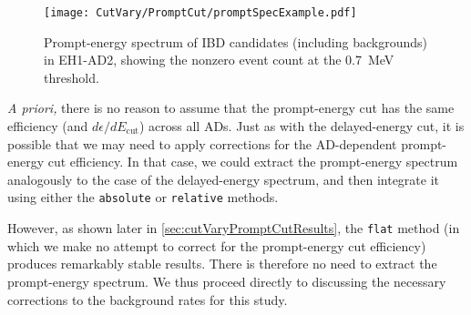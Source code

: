 \documentclass[../thesis.tex]{subfiles}
\begin{document}
\begin{figure}[h]
  \texttt{[image: CutVary/PromptCut/promptSpecExample.pdf]}
  \caption{Prompt-energy spectrum of IBD candidates (including backgrounds) in EH1-AD2, showing the nonzero event count at the 0.7~MeV threshold.}
  \label{fig:cutVaryPromptCutExampleSpectrum}
\end{figure}

\emph{A priori,} there is no reason to assume that the prompt-energy cut has the same efficiency (and $d\epsilon/dE_{\mathrm{cut}}$) across all ADs. Just as with the delayed-energy cut, it is possible that we may need to apply corrections for the AD-dependent prompt-energy cut efficiency. In that case, we could extract the prompt-energy spectrum analogously to the case of the delayed-energy spectrum, and then integrate it using either the \texttt{absolute} or \texttt{relative} methods.
%
\begin{comment}
Compared to the delayed-energy spectrum, it may be possible to more accurately measure the absolute efficiency, given the lack of a long tail. Even though the rate of prompt-like singles rises very steeply around 0.7~MeV, the accidentals rate is bottlenecked by the rate of delayed-like singles, so the accidentals subtraction can still be performed accurately. However, the \emph{correlated} backgrounds each have their own externally supplied prompt-energy spectra, which (as described in \autoref{sec:cutVaryPromptCutBkg}) must be individually integrated (to scale the rate) and subtracted. Hence, the measured prompt-energy spectrum could be skewed by any errors in the rates and spectra of the correlated backgrounds. Fortunately, the total rate of the correlated backgrounds is quite low.
We therefore don't expect the correlated backgrounds to pose a major difficulty in the prompt-energy spectrum extraction.
The above discussion is irrelevant, however, because as we shall see, the \texttt{flat} method (in which we make no attempt to correct for the prompt-energy cut efficiency) produces remarkably stable results. There is therefore no need to extract the prompt spectrum, so we will leave it at that.
\end{comment}
However, as shown later in \autoref{sec:cutVaryPromptCutResults}, the \texttt{flat} method (in which we make no attempt to correct for the prompt-energy cut efficiency) produces remarkably stable results. There is therefore no need to extract the prompt-energy spectrum. We thus proceed directly to discussing the necessary corrections to the background rates for this study.
\end{document}
